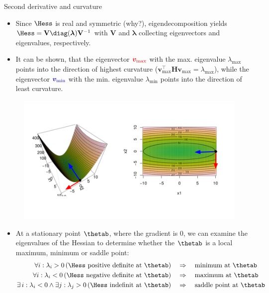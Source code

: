 \begin{vbframe}{Second derivative and curvature}
\begin{itemize}
  \item Since $\Hess$ is real and symmetric (why?), eigendecomposition yields
  $\Hess = \mathbf{V} \mathbf{\diag(\boldsymbol{\lambda})} \mathbf{V}^{-1}$
  with $\mathbf{V}$ and $\boldsymbol{\lambda}$ collecting eigenvectors and eigenvalues, respectively.
  \item It can be shown, that the eigenvector $\textcolor{red}{\bm{v}_{\text{max}}}$ with the max. eigenvalue $\lambda_{\text{max}}$ points into the direction of highest curvature ($\bm{v}_{\text{max}}^\top \bm{H} \bm{v}_{\text{max}} = \lambda_{\text{max}}$), while the eigenvector $\textcolor{blue}{\bm{v}_{\text{min}}}$ with the min. eigenvalue $\lambda_{\text{min}}$ points into the direction of least curvature. 
\end{itemize}

\vspace*{-0.5cm}

\begin{figure}
  \begin{center}
    \includegraphics[width=.7\textwidth]{figure/curvature2.png}
  \end{center}
\end{figure}

\framebreak 

\begin{itemize}
  \item At a stationary point $\thetab$, where the gradient is 0, we can examine the eigenvalues of the Hessian to determine whether the $\thetab$ is a local maximum, minimum or saddle point: 
  \vspace{-0.3cm}
  \begin{align*} 
  \quad\forall i: \lambda_i > 0  \, (\Hess \text{ positive definite at $\thetab$}) &\quad\Rightarrow\quad \text{minimum at $\thetab$} \\
  \quad\forall i: \lambda_i < 0 \, (\Hess \text{ negative definite at $\thetab$}) &\quad\Rightarrow\quad \text{maximum at $\thetab$}\\
  \exists\, i: \lambda_i < 0 \land  \exists j: \lambda_j > 0  \,(\Hess \text{ indefinit at $\thetab$}) &\quad\Rightarrow\quad \mbox{saddle point at $\thetab$}
  \end{align*}
\end{itemize}
   \begin{figure}
 \captionsetup{font=footnotesize,labelfont=footnotesize, labelfont = bf}


\end{figure}
\end{vbframe}
